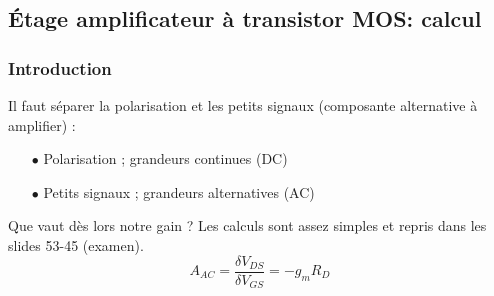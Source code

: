 	
	
	
	\subsection{Étage amplificateur à transistor MOS: calcul}
		\subsubsection{Introduction}
		Il faut séparer la polarisation et les petits signaux (composante alternative à 
		amplifier) :
		\begin{itemize}
		\item[$\bullet$] Polarisation ; grandeurs continues (DC)
		\item[$\bullet$] Petits signaux ; grandeurs alternatives (AC)		
		\end{itemize}
	
		Que vaut dès lors notre gain ? Les calculs sont assez simples et repris dans les 
		slides 53-45 (\danger examen).
		\begin{equation}
		A_{AC} = \dfrac{\delta V_{DS}}{\delta V_{GS}} = -g_mR_D
		\end{equation}
		
	
	
	
	
	
	
	
	
	
	
	
	
	
	
	
	
	
	
	
	
	
	